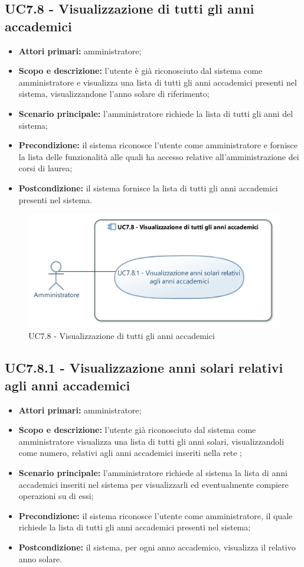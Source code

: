 \documentclass[AnalisiDeiRequisiti.tex]{subfiles}
\begin{document}
\subsection{UC7.8 - Visualizzazione di tutti gli anni accademici}
\begin{itemize}
	\item \textbf{Attori primari:} amministratore;
	\item \textbf{Scopo e descrizione:} l'utente è già riconosciuto dal sistema come amministratore e visualizza una lista di tutti gli anni accademici presenti nel sistema, visualizzandone l'anno solare di riferimento;
	\item \textbf{Scenario principale:} l'amministratore richiede la lista di tutti gli anni del sistema;
	\item \textbf{Precondizione:} il sistema riconosce l'utente come amministratore e fornisce la lista delle funzionalità alle quali ha accesso relative all'amministrazione dei corsi di laurea;
	\item \textbf{Postcondizione:} il sistema fornisce la lista di tutti gli anni accademici presenti nel sistema.
\end{itemize}
\begin{figure}[H]
	\centering
	\includegraphics[width=0.7\linewidth]{UC7_8.jpg}
	\caption{UC7.8 - Visualizzazione di tutti gli anni accademici}
	\label{UC7.8 - Visualizzazione di tutti gli anni accademici}
\end{figure}
\subsection{UC7.8.1 - Visualizzazione anni solari relativi agli anni accademici}
\begin{itemize}
	\item \textbf{Attori primari:} amministratore;
	\item \textbf{Scopo e descrizione:} l'utente già riconosciuto dal sistema come amministratore visualizza una lista di tutti gli anni solari, visualizzandoli come numero, relativi agli anni accademici inseriti nella rete ;
	\item \textbf{Scenario principale:} l'amministratore richiede al sistema la lista di anni accademici inseriti nel sistema per visualizzarli ed eventualmente compiere operazioni su di essi;
	\item \textbf{Precondizione:} il sistema riconosce l'utente come amministratore, il quale richiede la lista di tutti gli anni accademici presenti nel sistema;
	\item \textbf{Postcondizione:} il sistema, per ogni anno accademico, visualizza il relativo anno solare.
\end{itemize}
\end{document}
